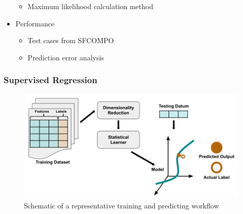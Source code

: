 \begin{frame}
\begin{adjustwidth}{-10pt}{0pt}
\begin{minipage}{0.58\textwidth}
\begin{itemize}
\begin{itemize}
          \item Maximum likelihood calculation method \cite{mll_method, mll_sensitivity}
        \end{itemize}
      \item Performance
        \begin{itemize}
          \item Test cases from SFCOMPO \cite{sfcompo}
          \item Prediction error analysis
        \end{itemize}
    \end{itemize}
  \end{minipage}
  \end{adjustwidth}
\end{frame}

\begin{frame}
  \frametitle{Supervised Regression}
  \begin{figure}
    \centering
    \includegraphics[width=\textwidth]{./figures/SupervisedRegression.png}
    \caption{Schematic of a representative training and predicting workflow}
  \end{figure}
\end{frame}


